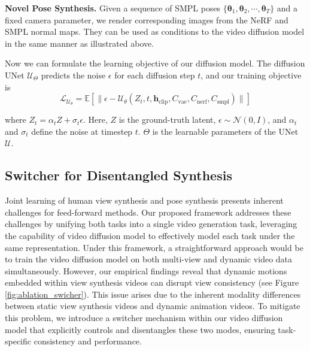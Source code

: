 \noindent \textbf{Novel Pose Synthesis.} Given a sequence of SMPL poses $\{\bm{\theta}_1, \bm{\theta}_2, \cdots, \bm{\theta}_T\}$ and a fixed camera parameter, we render corresponding images from the NeRF and SMPL normal maps. They can be used as conditions to the video diffusion model in the same manner as illustrated above.

Now we can formulate the learning objective of our diffusion model. The diffusion UNet \( \mathcal{U}_\Theta \) predicts the noise \( \epsilon \) for each diffusion step \( t \), and our training objective is
%
\begin{equation}
\mathcal{L}_{\mathcal{U}_{\theta}} = \mathbb{E} \left[ \| \epsilon - \mathcal{U}_{\theta} (Z_t, t, \bm{h}_{\text{clip}}, C_{\text{vae}}, C_{\text{nerf}}, C_{\text{smpl}}) \| \right] 
\label{eq:prev_objective}
\end{equation}


where \( Z_t = \alpha_t Z + \sigma_t \epsilon \). Here, \( Z \) is the ground-truth latent, \( \epsilon \sim \mathcal{N}(0, I) \), and \( \alpha_t \) and \( \sigma_t \) define the noise at timestep \( t \). $\Theta$ is the  learnable parameters of the UNet $\mathcal{U}$.



\subsection{Switcher for Disentangled Synthesis}
Joint learning of human view synthesis and pose synthesis presents inherent challenges for feed-forward methods. Our proposed framework addresses these challenges by unifying both tasks into a single video generation task, leveraging the capability of video diffusion model to effectively model each task under the same representation. Under this framework, a straightforward approach would be to train the video diffusion model on both multi-view and dynamic video data simultaneously. However, our empirical findings reveal that dynamic motions embedded within view synthesis videos can disrupt view consistency (see Figure \ref{fig:ablation_swicher}). This issue arises due to the inherent modality differences between static view synthesis videos and dynamic animation videos. To mitigate this problem, we introduce a switcher mechanism within our video diffusion model that explicitly controls and disentangles these two modes, ensuring task-specific consistency and performance.

